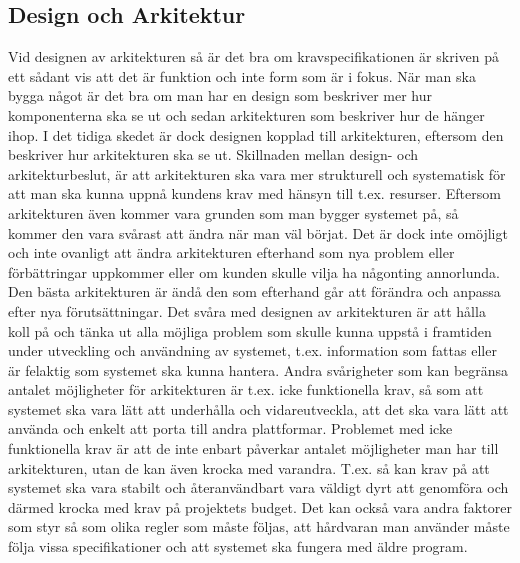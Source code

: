 \subsection{Design och Arkitektur}
Vid designen av arkitekturen så är det bra om kravspecifikationen är skriven på ett sådant vis att det är funktion och inte form som är i fokus. När man ska bygga något är det bra om man har en design som beskriver mer hur komponenterna ska se ut och sedan arkitekturen som beskriver hur de hänger ihop. I det tidiga skedet är dock designen kopplad till arkitekturen, eftersom den beskriver hur arkitekturen ska se ut.
\newline
\newline
Skillnaden mellan design- och arkitekturbeslut, är att arkitekturen ska vara mer strukturell och systematisk för att man ska kunna uppnå kundens krav med hänsyn till t.ex. resurser. Eftersom arkitekturen även kommer vara grunden som man bygger systemet på, så kommer den vara svårast att ändra när man väl börjat. Det är dock inte omöjligt och inte ovanligt att ändra arkitekturen efterhand som nya problem eller förbättringar uppkommer eller om kunden skulle vilja ha någonting annorlunda. Den bästa arkitekturen är ändå den som efterhand går att förändra och anpassa efter nya förutsättningar.
\newline
\newline
Det svåra med designen av arkitekturen är att hålla koll på och tänka ut alla möjliga problem som skulle kunna uppstå i framtiden under utveckling och användning av systemet, t.ex. information som fattas eller är felaktig som systemet ska kunna hantera. Andra svårigheter som kan begränsa antalet möjligheter för arkitekturen är t.ex. icke funktionella krav, så som att systemet ska vara lätt att underhålla och vidareutveckla, att det ska vara lätt att använda och enkelt att porta till andra plattformar. Problemet med icke funktionella krav är att de inte enbart påverkar antalet möjligheter man har till arkitekturen, utan de kan även krocka med varandra. T.ex. så kan krav på att systemet ska vara stabilt och återanvändbart vara väldigt dyrt att genomföra och därmed krocka med krav på projektets budget. Det kan också vara andra faktorer som styr så som olika regler som måste följas, att hårdvaran man använder måste följa vissa specifikationer och att systemet ska fungera med äldre program. \cite[s. 224--225]{set}
\newline
\newline
